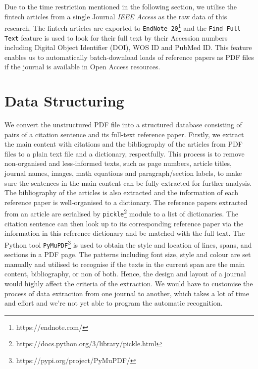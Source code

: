 Due to the time restriction mentioned in the following section, we utilise the fintech articles from a single Journal \textit{IEEE Access} as the raw data of this research.
The fintech articles are exported to \texttt{EndNote 20}\footnote{https://endnote.com/} and the \texttt{Find Full Text} feature is used to look for their full text by their Accession numbers including Digital Object Identifier (DOI), WOS ID and PubMed ID.
This feature enables us to automatically batch-download loads of reference papers as PDF files if the journal is available in Open Access resources.

\section{Data Structuring}
We convert the unstructured PDF file into a structured database consisting of pairs of a citation sentence and its full-text reference paper.
Firstly, we extract the main content with citations and the bibliography of the articles from PDF files to a plain text file and a dictionary, respectfully.
This process is to remove non-organised and less-informed texts, such as page numbers, article titles, journal names, images, math equations and paragraph/section labels, to make sure the sentences in the main content can be fully extracted for further analysis.
The bibliography of the articles is also extracted and the information of each reference paper is well-organised to a dictionary.
The reference papers extracted from an article are serialised by \texttt{pickle}\footnote{https://docs.python.org/3/library/pickle.html} module to a list of dictionaries.
The citation sentence can then look up to its corresponding reference paper via the information in this reference dictionary and be matched with the full text.
The Python tool \texttt{PyMuPDF}\footnote{https://pypi.org/project/PyMuPDF/} is used to obtain the style and location of lines, spans, and sections in a PDF page.
The patterns including font size, style and colour are set manually and utilised to recognise if the texts in the current span are the main content, bibliography, or non of both.
Hence, the design and layout of a journal would highly affect the criteria of the extraction.
We would have to customise the process of data extraction from one journal to another, which takes a lot of time and effort and we're not yet able to program the automatic recognition.

